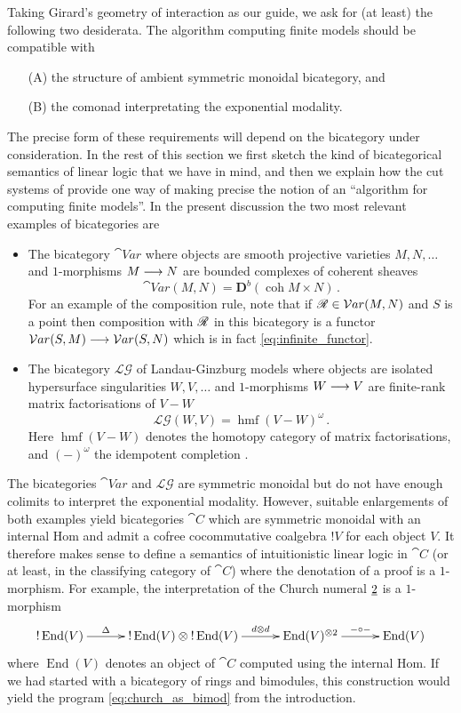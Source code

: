 \documentclass[english,letter paper,12pt,reqno]{article}
\theoremstyle{example}
\numberwithin{equation}{section}
\def\LG{\mathcal{LG}}
\DeclareMathOperator{\End}{End}
\DeclareMathOperator{\hmf}{hmf}
\begin{document}
Taking Girard's geometry of interaction as our guide, we ask for (at least) the following two desiderata. The algorithm computing finite models should be compatible with
\begin{itemize}
\item[(A)] the structure of ambient symmetric monoidal bicategory, and
\item[(B)] the comonad interpretating the exponential modality.
\end{itemize}  
The precise form of these requirements will depend on the bicategory under consideration. In the rest of this section we first sketch the kind of bicategorical semantics of linear logic that we have in mind, and then we explain how the cut systems of \cite{murfet} provide one way of making precise the notion of an ``algorithm for computing finite models''. In the present discussion the two most relevant examples of bicategories are
\begin{itemize}
\item The bicategory $\cat{V}ar$ \cite{ct1007.2679} where objects are smooth projective varieties $M,N,\ldots$ and $1$-morphisms $M \longrightarrow N$ are bounded complexes of coherent sheaves 
\[
\cat{V}ar(M,N) = \mathbf{D}^b(\operatorname{coh} M \times N)\,.
\]
For an example of the composition rule, note that if $\mathscr{R} \in \mathcal{V}ar(M,N)$ and $S$ is a point then composition with $\mathscr{R}$ in this bicategory is a functor $\mathcal{V}ar(S,M) \longrightarrow \mathcal{V}ar(S,N)$ which is in fact \eqref{eq:infinite_functor}.

\item The bicategory $\LG$ of Landau-Ginzburg models \cite{McNameethesis, lgdual, cr0909.4381} where objects are isolated hypersurface singularities $W,V,\ldots$ and $1$-morphisms $W \longrightarrow V$ are finite-rank matrix factorisations of $V - W$
\[
\LG(W,V) = \hmf( V - W )^\omega\,.
\]
Here $\hmf(V - W)$ denotes the homotopy category of matrix factorisations, and $(-)^\omega$ the idempotent completion \cite{Yoshino90}.
\end{itemize}

The bicategories $\cat{V}ar$ and $\LG$ are symmetric monoidal but do not have enough colimits to interpret the exponential modality. However, suitable enlargements of both examples yield bicategories $\cat{C}$ which are symmetric monoidal with an internal Hom and admit a cofree cocommutative coalgebra ${!} V$ for each object $V$. It therefore makes sense to define a semantics of intuitionistic linear logic in $\cat{C}$ (or at least, in the classifying category of $\cat{C}$) where the denotation of a proof is a $1$-morphism. For example, the interpretation of the Church numeral $\underline{2}$ is a $1$-morphism
\begin{equation}
\xymatrix@C+0.5pc{
{!} \End(V) \ar[r]^-{\Delta} & {!} \End(V) \otimes {!} \End(V) \ar[r]^-{d \otimes d} & \End(V)^{\otimes 2} \ar[r]^-{- \circ -} & \End(V)
}
\end{equation}
where $\End(V)$ denotes an object of $\cat{C}$ computed using the internal Hom. If we had started with a bicategory of rings and bimodules, this construction would yield the program \eqref{eq:church_as_bimod} from the introduction. 
\end{document}
